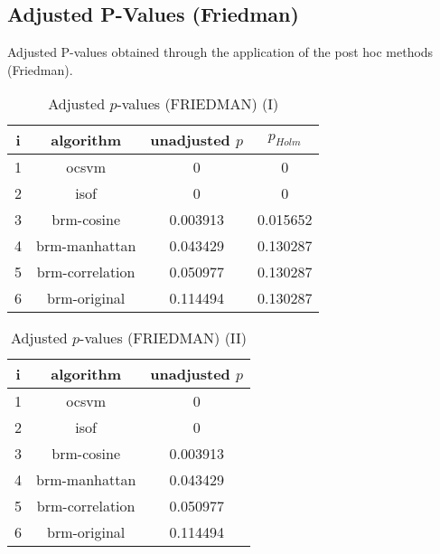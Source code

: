 \documentclass[a4paper,10pt]{article}
\begin{document}
\begin{landscape}
\newpage

\section{Adjusted P-Values (Friedman)}


Adjusted P-values obtained through the application of the post hoc methods (Friedman).

\begin{table}[!htp]
\centering\small
\begin{tabular}{cccc}
i&algorithm&unadjusted $p$&$p_{Holm}$\\
\hline1&ocsvm&0&0\\2&isof&0&0\\3&brm-cosine&0.003913&0.015652\\4&brm-manhattan&0.043429&0.130287\\5&brm-correlation&0.050977&0.130287\\6&brm-original&0.114494&0.130287\\\hline
\end{tabular}
\caption{Adjusted $p$-values (FRIEDMAN) (I)}
\end{table}
\begin{table}[!htp]
\centering\small
\begin{tabular}{ccc}
i&algorithm&unadjusted $p$\\
\hline1&ocsvm&0\\2&isof&0\\3&brm-cosine&0.003913\\4&brm-manhattan&0.043429\\5&brm-correlation&0.050977\\6&brm-original&0.114494\\\hline
\end{tabular}
\caption{Adjusted $p$-values (FRIEDMAN) (II)}
\end{table}

\newpage
\end{landscape}
\end{document}
